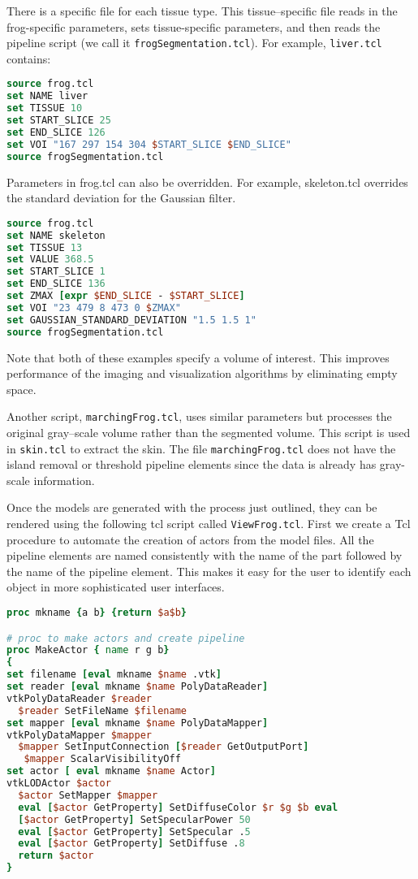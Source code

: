 There is a specific file for each tissue type. This tissue--specific file reads in the frog-specific parameters, sets tissue-specific parameters, and then reads the pipeline script (we call it  \texttt{frogSegmentation.tcl}). For example, \texttt{liver.tcl} contains:

\begin{lstlisting}[language=TCL, caption={Tissue specific file.}]
source frog.tcl
set NAME liver
set TISSUE 10
set START_SLICE 25
set END_SLICE 126
set VOI "167 297 154 304 $START_SLICE $END_SLICE"
source frogSegmentation.tcl
\end{lstlisting}

Parameters in frog.tcl can also be overridden. For example, skeleton.tcl overrides the standard deviation for the Gaussian filter.

\begin{lstlisting}[language=TCL, caption={Overriding parameters.}]
source frog.tcl
set NAME skeleton
set TISSUE 13
set VALUE 368.5
set START_SLICE 1
set END_SLICE 136
set ZMAX [expr $END_SLICE - $START_SLICE]
set VOI "23 479 8 473 0 $ZMAX"
set GAUSSIAN_STANDARD_DEVIATION "1.5 1.5 1"
source frogSegmentation.tcl
\end{lstlisting}

Note that both of these examples specify a volume of interest. This improves performance of the imaging and visualization algorithms by eliminating empty space.

Another script, \texttt{marchingFrog.tcl}, uses similar parameters but processes the original gray--scale volume rather than the segmented volume. This script is used in \texttt{skin.tcl} to extract the skin. The file \texttt{marchingFrog.tcl} does not have the island removal or threshold pipeline elements since the data is already has gray-scale information.

Once the models are generated with the process just outlined, they can be rendered using the following tcl script called \texttt{ViewFrog.tcl}. First we create a Tcl procedure to automate the creation of actors from the model files. All the pipeline elements are named consistently with the name of the part followed by the name of the pipeline element. This makes it easy for the user to identify each object in more sophisticated user interfaces.

\begin{lstlisting}[language=TCL, caption={Automating the creation of actors.}]
proc mkname {a b} {return $a$b}

# proc to make actors and create pipeline
proc MakeActor { name r g b}
{
set filename [eval mkname $name .vtk]
set reader [eval mkname $name PolyDataReader]
vtkPolyDataReader $reader
  $reader SetFileName $filename
set mapper [eval mkname $name PolyDataMapper]
vtkPolyDataMapper $mapper
  $mapper SetInputConnection [$reader GetOutputPort]
   $mapper ScalarVisibilityOff
set actor [ eval mkname $name Actor]
vtkLODActor $actor
  $actor SetMapper $mapper
  eval [$actor GetProperty] SetDiffuseColor $r $g $b eval
  [$actor GetProperty] SetSpecularPower 50
  eval [$actor GetProperty] SetSpecular .5
  eval [$actor GetProperty] SetDiffuse .8
  return $actor
}
\end{lstlisting}

